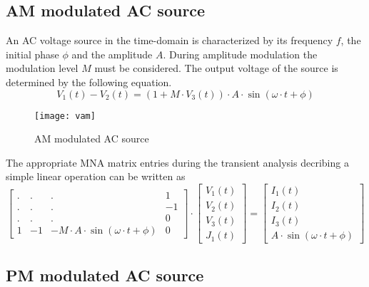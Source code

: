 \subsection{AM modulated AC source}

An AC voltage source in the time-domain is characterized by its
frequency $f$, the initial phase $\phi$ and the amplitude $A$.  During
amplitude modulation the modulation level $M$ must be considered.  The
output voltage of the source is determined by the following equation.
\begin{equation}
V_1\left(t\right) - V_2\left(t\right) = \left(1 + M\cdot V_3\left(t\right)\right)\cdot A\cdot \sin{\left(\omega\cdot t + \phi\right)}
\end{equation}

\begin{figure}[ht]
\begin{center}
\texttt{[image: vam]}
\end{center}
\label{fig:VAM}
\caption{AM modulated AC source}
\end{figure}
\FloatBarrier

The appropriate MNA matrix entries during the transient analysis
decribing a simple linear operation can be written as
\begin{equation}
\begin{bmatrix}
. & . & . & 1\\
. & . & . & -1\\
. & . & . & 0\\
1 & -1 & -M\cdot A\cdot \sin{\left(\omega\cdot t + \phi\right)} & 0
\end{bmatrix}
\cdot
\begin{bmatrix}
V_1\left(t\right)\\
V_2\left(t\right)\\
V_3\left(t\right)\\
J_1\left(t\right)
\end{bmatrix}
=
\begin{bmatrix}
I_1\left(t\right)\\
I_2\left(t\right)\\
I_3\left(t\right)\\
A\cdot \sin{\left(\omega\cdot t + \phi\right)}
\end{bmatrix}
\end{equation}

\subsection{PM modulated AC source}

